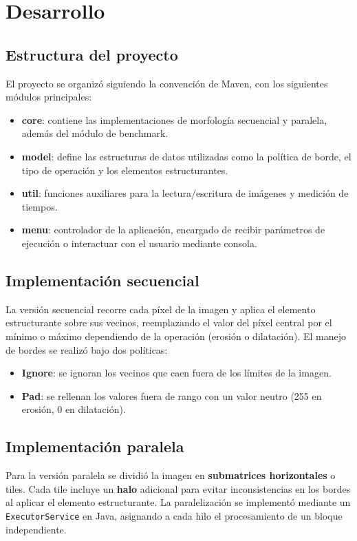 \documentclass[a4paper,12pt]{article}
\begin{document}
\section{Desarrollo}
\subsection{Estructura del proyecto}
El proyecto se organizó siguiendo la convención de Maven, con los siguientes módulos
principales:
\begin{itemize}
    \item \textbf{core}: contiene las implementaciones de morfología secuencial y paralela,
    además del módulo de benchmark.
    \item \textbf{model}: define las estructuras de datos utilizadas como la política de borde,
    el tipo de operación y los elementos estructurantes.
    \item \textbf{util}: funciones auxiliares para la lectura/escritura de imágenes y medición de tiempos.
    \item \textbf{menu}: controlador de la aplicación, encargado de recibir parámetros de ejecución
    o interactuar con el usuario mediante consola.
\end{itemize}

\subsection{Implementación secuencial}
La versión secuencial recorre cada píxel de la imagen y aplica el elemento estructurante
sobre sus vecinos, reemplazando el valor del píxel central por el mínimo o máximo
dependiendo de la operación (erosión o dilatación).  
El manejo de bordes se realizó bajo dos políticas:
\begin{itemize}
    \item \textbf{Ignore}: se ignoran los vecinos que caen fuera de los límites de la imagen.
    \item \textbf{Pad}: se rellenan los valores fuera de rango con un valor neutro (255 en erosión,
    0 en dilatación).
\end{itemize}

\subsection{Implementación paralela}
Para la versión paralela se dividió la imagen en \textbf{submatrices horizontales} o tiles.
Cada tile incluye un \textbf{halo} adicional para evitar inconsistencias en los bordes
al aplicar el elemento estructurante.  
La paralelización se implementó mediante un \texttt{ExecutorService} en Java, asignando
a cada hilo el procesamiento de un bloque independiente.
\end{document}
